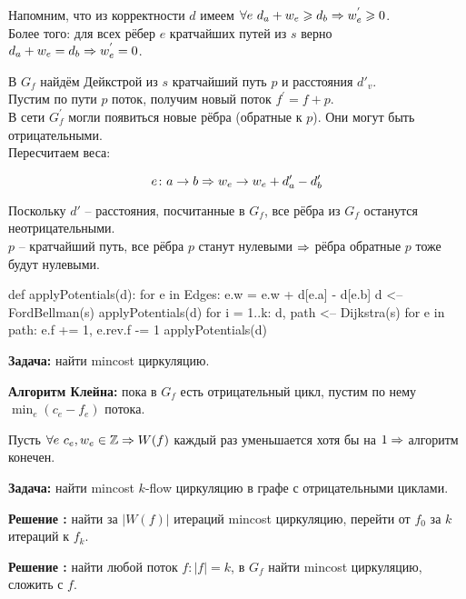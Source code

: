 Напомним, что из корректности $d$ имеем $\forall e \ d_a + w_e \geqslant d_b \Rightarrow w^{'}_e \geqslant 0$.\\
Более того: для всех рёбер $e$ кратчайших путей из $s$ верно $d_a + w_e = d_b \Rightarrow w^{'}_e = 0$.

\down
В $G_f$ найдём Дейкстрой из $s$ кратчайший путь $p$ и расстояния $d'_v$. \\
Пустим по пути $p$ поток, получим новый поток $f^{'} = f + p$.\\
В сети $G^{'}_f$ могли появиться новые рёбра (обратные к $p$). Они могут быть отрицательными.\\
Пересчитаем веса:

\vspace*{-1em}
\begin{smallformula}
$$e \colon a \to b \Rightarrow w_e \rightarrow w_e + d'_a - d'_b$$
\end{smallformula}
Поскольку $d'$ -- расстояния, посчитанные в $G_f$, все рёбра из $G_f$ останутся неотрицательными.\\
$p$ -- кратчайший путь, все рёбра $p$ станут нулевыми $\Rightarrow$ рёбра обратные $p$ тоже будут нулевыми.


\begin{codep}
def applyPotentials(d):
	for e in Edges:
		e.w = e.w + d[e.a] - d[e.b]
d <-- FordBellman(s)
applyPotentials(d)
for i = 1..k:
	d, path <-- Dijkstra(s)
	for e in path: e.f += 1, e.rev.f -= 1
	applyPotentials(d)
\end{codep}



{\bf Задача:} найти mincost циркуляцию.

\down
{\bf Алгоритм Клейна:} пока в $G_f$ есть отрицательный цикл, пустим по нему $\min_e(c_e-f_e)$ потока.

\down
Пусть $\forall e \ c_e, w_e \in \mathbb{Z} \Rightarrow W(f)$ каждый раз уменьшается хотя бы на $1 \Rightarrow$  алгоритм конечен.

\down
{\bf Задача:} найти mincost $k$-flow циркуляцию в графе с отрицательными циклами.

\down
{\bf Решение :} найти за $|W(f)|$ итераций mincost циркуляцию, перейти от $f_0$ за $k$ итераций к $f_k$.

{\bf Решение :} найти любой поток $f \colon |f| = k$, в $G_f$ найти mincost циркуляцию, сложить с $f$.

